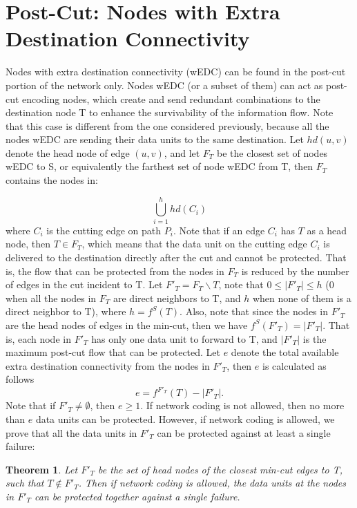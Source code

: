 \documentclass[conference]{IEEEtran}
\newtheorem{theorem}{Theorem}
\begin{document}
\section{Post-Cut: Nodes with Extra Destination Connectivity}
\label{Sec:postCut}

Nodes with extra destination connectivity (wEDC) can be found in the post-cut portion of the network only. Nodes wEDC (or a subset of them) can act as post-cut encoding nodes, which create and send redundant combinations to the destination node T to enhance the survivability of the information flow. Note that this case is different from the one considered previously, because all the nodes wEDC are sending their data units to the same destination. Let $hd(u,v)$ denote the head node of edge $(u,v)$, and let $F_T$ be the closest set of nodes wEDC to S, or equivalently the farthest set of node wEDC from T, then $F_T$ contains the nodes in:

\[\bigcup_{i=1}^h hd(C_i)\] where $C_i$ is the cutting edge on path $P_i$. Note that if an edge $C_i$ has $T$ as a head node, then $T \in F_T$, which means that the data unit on the cutting edge $C_i$ is delivered to the destination directly after the cut and cannot be protected. That is, the flow that can be protected from the nodes in $F_T$ is reduced by the number of edges in the cut incident to T. Let $F'_T = F_T \backslash T$, note that $0 \leq |F'_T| \leq h$ (0 when all the nodes in $F_T$ are direct neighbors to T, and $h$ when none of them is a direct neighbor to T), where $h=f^S(T)$. Also, note that since the nodes in $F'_T$ are the head nodes of edges in the min-cut, then we have $f^S(F'_T) = |F'_T|$. That is, each node in $F'_T$ has only one data unit to forward to T, and $|F'_T|$ is the maximum post-cut flow that can be protected. Let $e$ denote the total available extra destination connectivity from the nodes in $F'_T$, then $e$ is calculated as follows \[e = f^{F'_T}(T) - |F'_T|.\] Note that if $F'_T \neq \emptyset$, then $e \geq 1$. If network coding is not allowed, then no more than $e$ data units can be protected. However, if network coding is allowed, we prove that all the data units in $F'_T$ can be protected against at least a single failure:



\begin{theorem}
Let $F'_T$ be the set of head nodes of the closest min-cut edges to T, such that $T \notin F'_T$. Then if network coding is allowed, the data units at the nodes in $F'_T$ can be protected together against a single failure.  
\end{theorem} 
\end{document}
